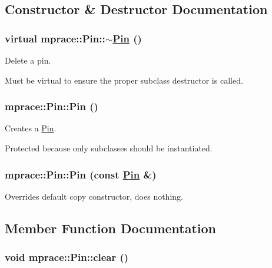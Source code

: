 \subsection{Constructor \& Destructor Documentation}
\hypertarget{classmprace_1_1Pin_a0}{
\subsubsection[$\sim$Pin]{\setlength{\rightskip}{0pt plus 5cm}virtual mprace::Pin::$\sim$\hyperlink{classmprace_1_1Pin}{Pin} ()}}
\label{classmprace_1_1Pin_a0}


Delete a pin. 

Must be virtual to ensure the proper subclass destructor is called.\hypertarget{classmprace_1_1Pin_b0}{
\subsubsection[Pin]{\setlength{\rightskip}{0pt plus 5cm}mprace::Pin::Pin ()}}
\label{classmprace_1_1Pin_b0}


Creates a \hyperlink{classmprace_1_1Pin}{Pin}. 

Protected because only subclasses should be instantiated.\hypertarget{classmprace_1_1Pin_b1}{
\subsubsection[Pin]{\setlength{\rightskip}{0pt plus 5cm}mprace::Pin::Pin (const \hyperlink{classmprace_1_1Pin}{Pin} \&)}}
\label{classmprace_1_1Pin_b1}


Overrides default copy constructor, does nothing. 



\subsection{Member Function Documentation}
\hypertarget{classmprace_1_1Pin_a4}{
\subsubsection[clear]{\setlength{\rightskip}{0pt plus 5cm}void mprace::Pin::clear ()}}
\label{classmprace_1_1Pin_a4}


